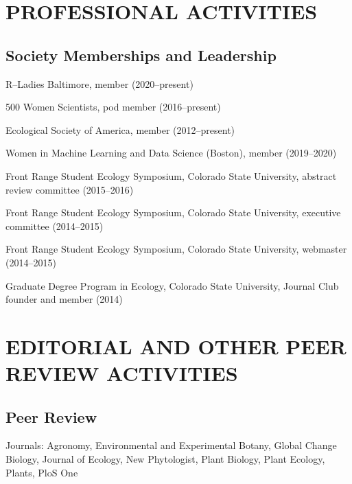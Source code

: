 \documentclass{cv}
\begin{document}
\section*{PROFESSIONAL ACTIVITIES}

\subsection*{Society Memberships and Leadership}

R--Ladies Baltimore, member (2020--present)

500 Women Scientists, pod member (2016--present)

Ecological Society of America, member (2012--present)

Women in Machine Learning and Data Science (Boston), member (2019--2020)

Front Range Student Ecology Symposium, Colorado State University, abstract review committee (2015--2016)

Front Range Student Ecology Symposium, Colorado State University, executive committee (2014--2015)

Front Range Student Ecology Symposium, Colorado State University, webmaster (2014--2015)

Graduate Degree Program in Ecology, Colorado State University, Journal Club founder and member (2014)


\section*{EDITORIAL AND OTHER PEER REVIEW ACTIVITIES}

\subsection*{Peer Review}

Journals: Agronomy, Environmental and Experimental Botany, Global Change Biology, Journal of Ecology, New Phytologist, Plant Biology, Plant Ecology, Plants, PloS One

\end{document}
